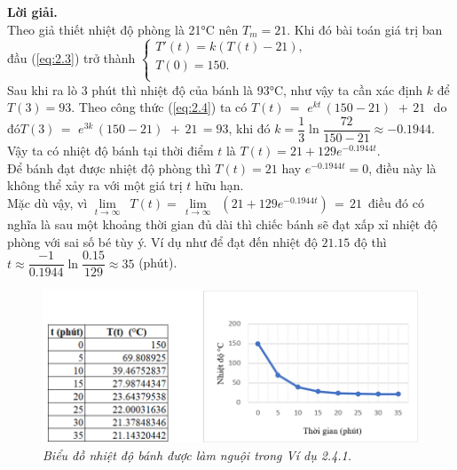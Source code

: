 \textbf{Lời giải. }\\
Theo giả thiết nhiệt độ phòng là 21°C nên ${{T}_{m}}=21$. Khi đó bài toán giá trị ban đầu (\ref{eq:2.3}) trở thành $\left\{ \begin{array}{l}
	 {T}'(t)=k\left( T(t)-21 \right), \\ 
	 T(0)=150. \\ 
\end{array} \right.$\\
Sau khi ra lò $3$ phút thì nhiệt độ của bánh là 93°C, như vậy ta cần xác định $k$ để $T(3) = 93$. Theo công thức (\ref{eq:2.4}) ta có $T(t)\,=\,\,{{e}^{kt}}\,(150-21)\,\,+\,21\,\,$ do đó\newline $T(3)\,=\,\,{{e}^{3k}}\,(150-21)\,\,+\,21\,=93$, khi đó $k=\dfrac{1}{3}\ln \dfrac{72}{150-21}\approx -0.1944$.\\  
Vậy ta có nhiệt độ bánh tại thời điểm $t$ là $T(t)=21+129{{e}^{-0.1944t}}.$ \\
Để bánh đạt được nhiệt độ phòng thì $T(t) = 21$ hay ${{e}^{-0.1944t}}=0$, điều này là không thể xảy ra với một giá trị $t$ hữu hạn.\\ Mặc dù vậy, vì $\underset{t\to \infty }{\mathop{\lim }}\,\,\,T(t)=\,\underset{t\to \infty }{\mathop{\lim }}\,\,\,(21+129{{e}^{-0.1944t}})\,=\,21\,$ điều đó có nghĩa là sau một khoảng thời gian đủ dài thì chiếc bánh sẽ đạt xấp xỉ nhiệt độ phòng với sai số bé tùy ý. Ví dụ như để đạt đến nhiệt độ $21.15$ độ thì 
$t\approx \dfrac{-1}{0.1944}\ln \dfrac{0.15}{129}\approx 35$ (phút).
\begin{figure}[H]
	\centering
	\includegraphics[scale=0.8]{Images/hinh_2_8.png}
	\caption[Biểu đồ nhiệt độ bánh được làm nguội trong Ví dụ 2.4.1.]{\itshape\fontsize{13pt}{0pt}\selectfont\centering Biểu đồ nhiệt độ bánh được làm nguội trong Ví dụ 2.4.1.}
	\label{hinh2.8}
\end{figure}
